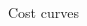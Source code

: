 \begin{vbframe}{Cost curves}
\begin{columns}[T]
\begin{column}{0.34\textwidth}
\end{column}
\end{columns}



\end{vbframe}



